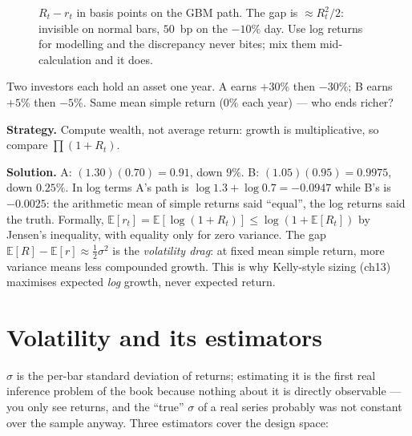 \begin{figure}[ht]\centering

\caption{$R_t - r_t$ in basis points on the GBM path. The gap is
$\approx R_t^2/2$: invisible on normal bars, $50$~bp on the
$-10\%$ day. Use log returns for modelling and the discrepancy never
bites; mix them mid-calculation and it does.}
\label{fig:simplelog}
\end{figure}

\begin{example}\label{ex:drag}
Two investors each hold an asset one year. A earns $+30\%$ then
$-30\%$; B earns $+5\%$ then $-5\%$. Same mean simple return
($0\%$ each year) --- who ends richer?

\textbf{Strategy.} Compute wealth, not average return: growth is
multiplicative, so compare $\prod(1+R_t)$.

\textbf{Solution.} A: $(1.30)(0.70)=0.91$, down $9\%$. B:
$(1.05)(0.95)=0.9975$, down $0.25\%$. In log terms A's path is
$\log1.3+\log0.7 = -0.0947$ while B's is $-0.0025$: the arithmetic
mean of simple returns said ``equal'', the log returns said the truth.
Formally, $\mathbb E[r_t] = \mathbb E[\log(1+R_t)] \le
\log(1+\mathbb E[R_t])$ by Jensen's inequality, with equality only for
zero variance. The gap $\mathbb E[R]-\mathbb E[r]\approx
\tfrac12\sigma^2$ is the \emph{volatility drag}: at fixed mean simple
return, more variance means less compounded growth. This is why
Kelly-style sizing (ch13) maximises expected \emph{log} growth,
never expected return.
\end{example}

\section{Volatility and its estimators}\label{sec:estimators}
$\sigma$ is the per-bar standard deviation of returns; estimating it
is the first real inference problem of the book because nothing about
it is directly observable --- you only see returns, and the
``true'' $\sigma$ of a real series probably was not constant over the
sample anyway. Three estimators cover the design space:

